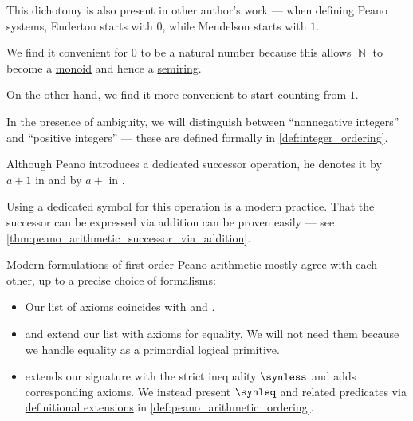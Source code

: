 \begin{remark}
\begin{thmenum}
    This dichotomy is also present in other author's work --- when defining Peano systems, Enderton starts with \( 0 \), while Mendelson starts with \( 1 \).

    We find it convenient for \( 0 \) to be a natural number because this allows \( \BbbN \) to become a \hyperref[def:monoid]{monoid} and hence a \hyperref[def:semiring]{semiring}.

    On the other hand, we find it more convenient to start counting from \( 1 \).

    In the presence of ambiguity, we will distinguish between \enquote{nonnegative integers} and \enquote{positive integers} --- these are defined formally in \cref{def:integer_ordering}.

     Although Peano introduces a dedicated successor operation, he denotes it by \( a + 1 \) in \cite[1]{Peano1889ArithmeticesPrincipia} and by \( a+ \) in \cite[27]{Peano1908FormulatioMathematico}.

    Using a dedicated symbol for this operation is a modern practice. That the successor can be expressed via addition can be proven easily --- see \cref{thm:peano_arithmetic_successor_via_addition}.

     Modern formulations of first-order Peano arithmetic mostly agree with each other, up to a precise choice of formalisms:
    \begin{itemize}
      \item Our list of axioms coincides with \cite[def. 2.7.7]{VanDalen2004LogicAndStructure} and \cite[\S 5.2.5]{Mimram2020ProgramEqualsProof}.

      \item \Textcite[105]{КолмогоровДрагалин2006ЛогикаВведение} and \textcite[167]{Герасимов2014Вычислимость} extend our list with axioms for equality. We will not need them because we handle equality as a primordial logical primitive.

      \item \Textcite*[def. 4.1.1(ii)]{Hinman2005Logic} extends our signature with the strict inequality \( \synless \) and adds corresponding axioms. We instead present \( \synleq \) and related predicates via \hyperref[def:fol_definitional_extension]{definitional extensions} in \cref{def:peano_arithmetic_ordering}.
    \end{itemize}
  \end{thmenum}
\end{remark}

